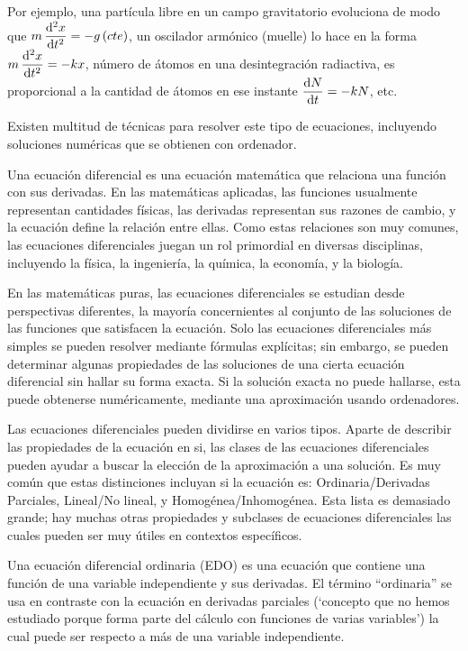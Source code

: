 Por ejemplo, una partícula libre en un campo gravitatorio evoluciona de modo que $\displaystyle m\, \dv[2]{x}{t}=-g\, (cte)$, un oscilador armónico (muelle) lo hace en la forma $\displaystyle m\, \dv[2]{x}{t}=-kx$, número de átomos en una desintegración radiactiva, es proporcional a la cantidad de átomos en ese instante $\displaystyle \dv{N}{t}=-kN$, etc.

Existen multitud de técnicas para resolver este tipo de ecuaciones, incluyendo soluciones numéricas que se obtienen con ordenador.



Una ecuación diferencial es una ecuación matemática que relaciona una función con sus derivadas. En las matemáticas aplicadas, las funciones usualmente representan cantidades físicas, las derivadas representan sus razones de cambio, y la ecuación define la relación entre ellas. Como estas relaciones son muy comunes, las ecuaciones diferenciales juegan un rol primordial en diversas disciplinas, incluyendo la física, la ingeniería, la química, la economía, y la biología.

En las matemáticas puras, las ecuaciones diferenciales se estudian desde perspectivas diferentes, la mayoría concernientes al conjunto de las soluciones de las funciones que satisfacen la ecuación. Solo las ecuaciones diferenciales más simples se pueden resolver mediante fórmulas explícitas; sin embargo, se pueden determinar algunas propiedades de las soluciones de una cierta ecuación diferencial sin hallar su forma exacta. Si la solución exacta no puede hallarse, esta puede obtenerse numéricamente, mediante una aproximación usando ordenadores. 

Las ecuaciones diferenciales pueden dividirse en varios tipos. Aparte de describir las propiedades de la ecuación en si, las clases de las ecuaciones diferenciales pueden ayudar a buscar la elección de la aproximación a una solución. Es muy común que estas distinciones incluyan si la ecuación es: Ordinaria/Derivadas Parciales, Lineal/No lineal, y Homogénea/Inhomogénea. Esta lista es demasiado grande; hay muchas otras propiedades y subclases de ecuaciones diferenciales las cuales pueden ser muy útiles en contextos específicos.

Una ecuación diferencial ordinaria (EDO) es una ecuación que contiene una función de una variable independiente y sus derivadas. El término ``ordinaria'' se usa en contraste con la ecuación en derivadas parciales (`concepto que no hemos estudiado porque forma parte del cálculo con funciones de varias variables') la cual puede ser respecto a más de una variable independiente.

